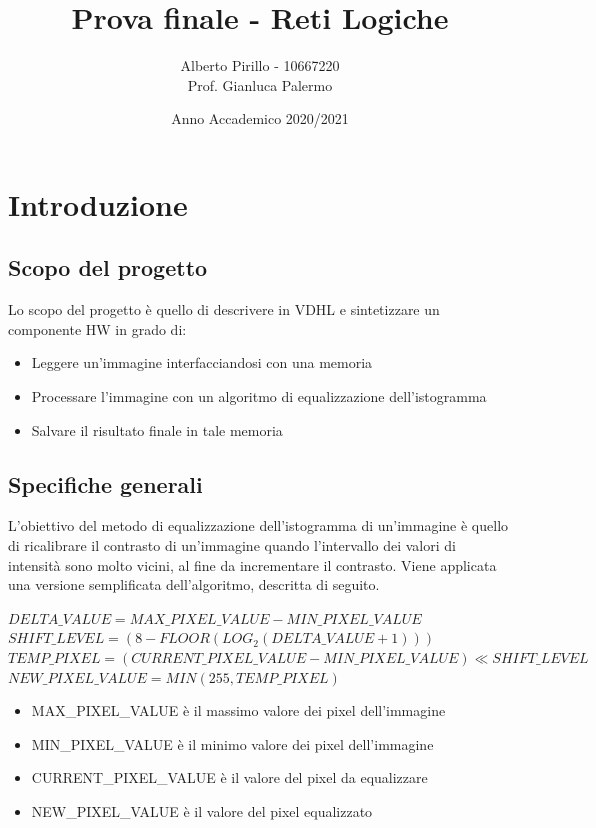 \documentclass[a4paper, 12pt]{article}
\title{\Huge{Prova finale - Reti Logiche}}
\author{\Large{Alberto Pirillo - 10667220} \\ \Large{Prof. Gianluca Palermo}}
\date{Anno Accademico 2020/2021}
\begin{document}
\maketitle
\tableofcontents
\pagebreak

\section{Introduzione}
\subsection{Scopo del progetto}
Lo scopo del progetto è quello di descrivere in VDHL e sintetizzare un componente HW in grado di:
\begin{itemize}
    \item Leggere un'immagine interfacciandosi con una memoria
    \item Processare l'immagine con un algoritmo di equalizzazione dell'istogramma
    \item Salvare il risultato finale in tale memoria
\end{itemize}

\subsection{Specifiche generali}
L'obiettivo del metodo di equalizzazione dell'istogramma di un'immagine è quello di ricalibrare il contrasto di un'immagine quando l'intervallo dei valori di intensità sono molto vicini, al fine da incrementare il contrasto. Viene applicata una versione semplificata dell'algoritmo, descritta di seguito.

\bigskip\noindent\footnotesize
$DELTA\_VALUE = MAX\_PIXEL\_VALUE - MIN\_PIXEL\_VALUE$ \\
$SHIFT\_LEVEL = (8-FLOOR(LOG_2(DELTA\_VALUE + 1)))$ \\
$TEMP\_PIXEL = (CURRENT\_PIXEL\_VALUE - MIN\_PIXEL\_VALUE) \ll SHIFT\_LEVEL$ \\
$NEW\_PIXEL\_VALUE = MIN(255, TEMP\_PIXEL)$
\bigskip\normalsize

\begin{itemize}
    \item MAX\_PIXEL\_VALUE è il massimo valore dei pixel dell'immagine
    \item MIN\_PIXEL\_VALUE è il minimo valore dei pixel dell'immagine
    \item CURRENT\_PIXEL\_VALUE è il valore del pixel da equalizzare 
    \item NEW\_PIXEL\_VALUE è il valore del pixel equalizzato
\end{itemize}
\end{document}
